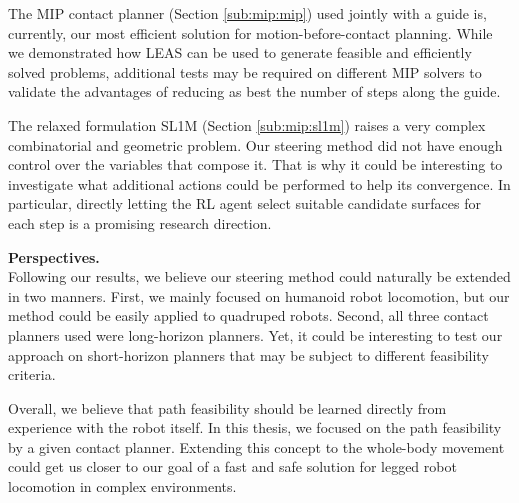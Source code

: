 The MIP contact planner (Section \ref{sub:mip:mip}) used jointly with a guide is, currently, our most efficient solution for motion-before-contact planning.
While we demonstrated how LEAS can be used to generate feasible and efficiently solved problems, additional tests may be required on different MIP solvers to validate
the advantages of reducing as best the number of steps along the guide.

The relaxed formulation SL1M (Section \ref{sub:mip:sl1m}) raises a very complex combinatorial and geometric problem.
Our steering method did not have enough control over the variables that compose it. That is why it could be interesting to investigate what additional actions could be performed to help its convergence. In particular, directly letting the RL agent select suitable candidate surfaces for each step is a promising research direction.



\hfill \break

\noindent\textbf{Perspectives.}\\

Following our results, we believe our steering method could naturally be extended in two manners.
First, we mainly focused on humanoid robot locomotion, but our method could be easily applied to quadruped robots.
Second, all three contact planners used were long-horizon planners. Yet, it could be interesting to test our approach on short-horizon planners that may be subject to different feasibility criteria.


Overall, we believe that path feasibility should be learned directly from experience with the robot itself.
In this thesis, we focused on the path feasibility by a given contact planner. Extending this concept to the whole-body movement could get us closer to our goal of a fast and safe solution for legged robot locomotion in complex environments.

